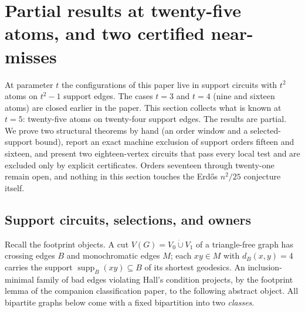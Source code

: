%
%

\section{Partial results at twenty-five atoms, and two certified
near-misses}\label{sec:t5partial}

At parameter \(t\) the configurations of this paper live in support
circuits with \(t^2\) atoms on \(t^2-1\) support edges. The cases
\(t=3\) and \(t=4\) (nine and sixteen atoms) are closed earlier in the
paper. This section collects what is known at \(t=5\): twenty-five
atoms on twenty-four support edges. The results are partial. We prove
two structural theorems by hand (an order window and a selected-support
bound), report an exact machine exclusion of support orders fifteen and
sixteen, and present two eighteen-vertex circuits that pass every local
test and are excluded only by explicit certificates. Orders seventeen
through twenty-one remain open, and nothing in this section touches the
Erd\H{o}s \(n^2/25\) conjecture itself.

\subsection{Support circuits, selections, and owners}

Recall the footprint objects. A cut \(V(G)=V_0\mathbin{\dot\cup}V_1\)
of a triangle-free graph has crossing edges \(B\) and monochromatic
edges \(M\); each \(xy\in M\) with \(d_B(x,y)=4\) carries the support
\(\operatorname{supp}_B(xy)\subseteq B\) of its shortest geodesics. An
inclusion-minimal family of bad edges violating Hall's condition
projects, by the footprint lemma of the companion classification
paper, to the following abstract object. All bipartite graphs below
come with a fixed bipartition into two \emph{classes}.


